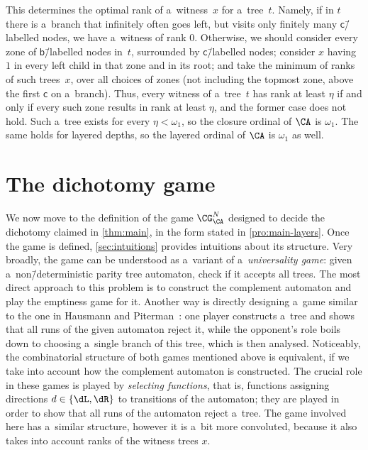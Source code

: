 \documentclass{lmcs}
\numberwithin{equation}{section}
\numberwithin{figure}{section}
\begin{document}
\begin{exa}
	This determines the optimal rank of a~witness~$x$ for a~tree~$t$.
	Namely, if in $t$ there is a~branch that infinitely often goes left, but visits only finitely many $\mathsf{c}$\=/labelled nodes, we have a~witness of rank $0$.
	Otherwise, we should consider every zone of $\mathsf{b}$\=/labelled nodes in~$t$, surrounded by $\mathsf{c}$\=/labelled nodes;
	consider $x$ having $1$ in every left child in that zone and in its root; and take the minimum of ranks of such trees~$x$, over all choices of zones
	(not including the topmost zone, above the first $\mathsf{c}$ on a~branch).
	Thus, every witness of a~tree~$t$ has rank at least $\eta$ if and only if every such zone results in rank at least $\eta$, and the former case does not hold.
	Such a~tree exists for every $\eta<\omega_1$, so the closure ordinal of $\CA$ is $\omega_1$.
	The same holds for layered depths, so the layered ordinal of $\CA$ is $\omega_1$ as well.
\end{exa}



\section{The dichotomy game}

We now move to the definition of the game $\CG^N_\CA$ designed to decide the dichotomy claimed in \cref{thm:main}, in the form stated in \cref{pro:main-layers}.
Once the game is defined, \cref{sec:intuitions} provides intuitions about its structure.
Very broadly, the game can be understood as a~variant of a~\emph{universality game}: given a~non\=/deterministic parity tree automaton, check if it accepts all trees.
The most direct approach to this problem is to construct the complement automaton and play the emptiness game for it.
Another way is directly designing a~game similar to the one in Hausmann and Piterman~\cite[Section~4.2]{Hausmann2022}:
one player constructs a~tree and shows that all runs of the given automaton reject it, while the opponent's role boils down to choosing a~single branch of this tree, which is then analysed.
Noticeably, the combinatorial structure of both games mentioned above is equivalent, if we take into account how the complement automaton is constructed.
The crucial role in these games is played by \emph{selecting functions}, that is, functions assigning directions $d\in\{\dL,\dR\}$ to transitions of the automaton;
they are played in order to show that all runs of the automaton reject a~tree.
The game involved here has a~similar structure, however it is a~bit more convoluted, because it also takes into account ranks of the witness trees $x$.
\end{document}
